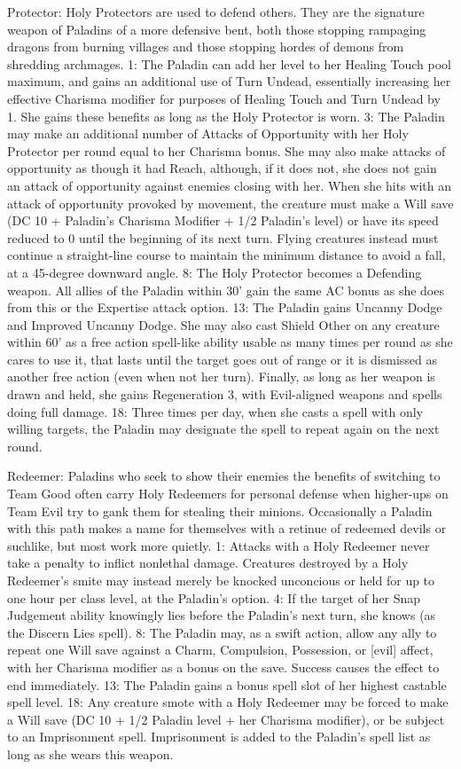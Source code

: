 {Protector:
Holy Protectors are used to defend others.  They are the signature weapon of Paladins of a more defensive bent, both those stopping rampaging dragons from burning villages and those stopping hordes of demons from shredding archmages.
1: The Paladin can add her level to her Healing Touch pool maximum, and gains an additional use of Turn Undead, essentially increasing her effective Charisma modifier for purposes of Healing Touch and Turn Undead by 1.  She gains these benefits as long as the Holy Protector is worn.
3: The Paladin may make an additional number of Attacks of Opportunity with her Holy Protector per round equal to her Charisma bonus.  She may also make attacks of opportunity as though it had Reach, although, if it does not, she does not gain an attack of opportunity against enemies closing with her.  When she hits with an attack of opportunity provoked by movement, the creature must make a Will save (DC 10 + Paladin's Charisma Modifier + 1/2 Paladin's level) or have its speed reduced to 0 until the beginning of its next turn.  Flying creatures instead must continue a straight-line course to maintain the minimum distance to avoid a fall, at a 45-degree downward angle.
8: The Holy Protector becomes a Defending weapon.  All allies of the Paladin within 30' gain the same AC bonus as she does from this or the Expertise attack option.
13: The Paladin gains Uncanny Dodge and Improved Uncanny Dodge.  She may also cast Shield Other on any creature within 60' as a free action spell-like ability usable as many times per round as she cares to use it, that lasts until the target goes out of range or it is dismissed as another free action (even when not her turn).  Finally, as long as her weapon is drawn and held, she gains Regeneration 3, with Evil-aligned weapons and spells doing full damage.
18: Three times per day, when she casts a spell with only willing targets, the Paladin may designate the spell to repeat again on the next round.

Redeemer:
Paladins who seek to show their enemies the benefits of switching to Team Good often carry Holy Redeemers for personal defense when higher-ups on Team Evil try to gank them for stealing their minions.  Occasionally a Paladin with this path makes a name for themselves with a retinue of redeemed devils or suchlike, but most work more quietly.
1: Attacks with a Holy Redeemer never take a penalty to inflict nonlethal damage.  Creatures destroyed by a Holy Redeemer's smite may instead merely be knocked unconcious or held for up to one hour per class level, at the Paladin's option.
4: If the target of her Snap Judgement ability knowingly lies before the Paladin's next turn, she knows (as the Discern Lies spell).
8: The Paladin may, as a swift action, allow any ally to repeat one Will save against a Charm, Compulsion, Possession, or [evil] affect, with her Charisma modifier as a bonus on the save.  Success causes the effect to end immediately.
13: The Paladin gains a bonus spell slot of her highest castable spell level.
18: Any creature smote with a Holy Redeemer may be forced to make a Will save (DC 10 + 1/2 Paladin level + her Charisma modifier), or be subject to an Imprisonment spell.  Imprisonment is added to the Paladin's spell list as long as she wears this weapon.}

